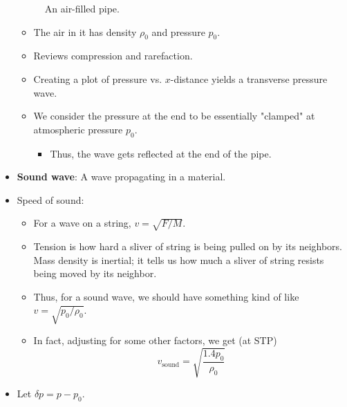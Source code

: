 \documentclass[../notes.tex]{subfiles}
\begin{document}
\begin{itemize}
\begin{figure}[h!]
        \caption{An air-filled pipe.}
        \label{fig:pipeWithAir}
    \end{figure}
    \begin{itemize}
        \item The air in it has density $\rho_0$ and pressure $p_0$.
        \item Reviews compression and rarefaction.
        \item Creating a plot of pressure vs. $x$-distance yields a transverse pressure wave.
        \item We consider the pressure at the end to be essentially "clamped" at atmospheric pressure $p_0$.
        \begin{itemize}
            \item Thus, the wave gets reflected at the end of the pipe.
        \end{itemize}
    \end{itemize}
    \item \textbf{Sound wave}: A wave propagating in a material.
    \item Speed of sound:
    \begin{itemize}
        \item For a wave on a string, $v=\sqrt{F/M}$.
        \item Tension is how hard a sliver of string is being pulled on by its neighbors. Mass density is inertial; it tells us how much a sliver of string resists being moved by its neighbor.
        \item Thus, for a sound wave, we should have something kind of like $v=\sqrt{p_0/\rho_0}$.
        \item In fact, adjusting for some other factors, we get (at STP)
        \begin{equation*}
            v_\text{sound} = \sqrt{\frac{1.4p_0}{\rho_0}}
        \end{equation*}
    \end{itemize}
    \item Let $\delta p=p-p_0$.
    \begin{figure}[h!]
        \centering
\end{figure}
\end{itemize}
\end{document}
